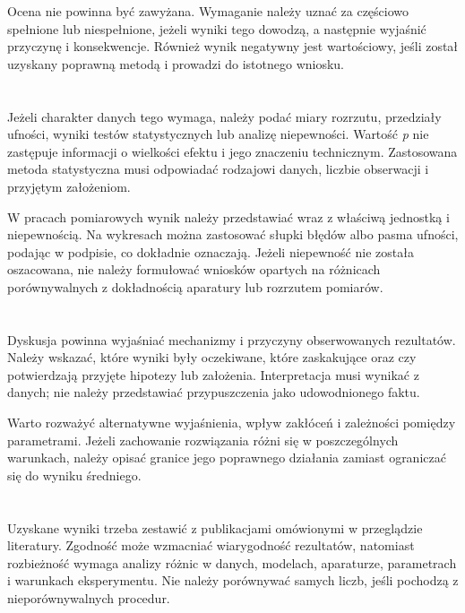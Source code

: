 Ocena nie powinna być zawyżana. Wymaganie należy uznać za częściowo spełnione lub niespełnione, jeżeli wyniki tego dowodzą, a następnie wyjaśnić przyczynę i konsekwencje. Również wynik negatywny jest wartościowy, jeśli został uzyskany poprawną metodą i prowadzi do istotnego wniosku.

\section{}

Jeżeli charakter danych tego wymaga, należy podać miary rozrzutu, przedziały ufności, wyniki testów statystycznych lub analizę niepewności. Wartość \emph{p} nie zastępuje informacji o wielkości efektu i jego znaczeniu technicznym. Zastosowana metoda statystyczna musi odpowiadać rodzajowi danych, liczbie obserwacji i przyjętym założeniom.

W pracach pomiarowych wynik należy przedstawiać wraz z właściwą jednostką i niepewnością. Na wykresach można zastosować słupki błędów albo pasma ufności, podając w podpisie, co dokładnie oznaczają. Jeżeli niepewność nie została oszacowana, nie należy formułować wniosków opartych na różnicach porównywalnych z dokładnością aparatury lub rozrzutem pomiarów.

\section{}

Dyskusja powinna wyjaśniać mechanizmy i przyczyny obserwowanych rezultatów. Należy wskazać, które wyniki były oczekiwane, które zaskakujące oraz czy potwierdzają przyjęte hipotezy lub założenia. Interpretacja musi wynikać z danych; nie należy przedstawiać przypuszczenia jako udowodnionego faktu.

Warto rozważyć alternatywne wyjaśnienia, wpływ zakłóceń i zależności pomiędzy parametrami. Jeżeli zachowanie rozwiązania różni się w poszczególnych warunkach, należy opisać granice jego poprawnego działania zamiast ograniczać się do wyniku średniego.

\section{}

Uzyskane wyniki trzeba zestawić z publikacjami omówionymi w przeglądzie literatury. Zgodność może wzmacniać wiarygodność rezultatów, natomiast rozbieżność wymaga analizy różnic w danych, modelach, aparaturze, parametrach i warunkach eksperymentu. Nie należy porównywać samych liczb, jeśli pochodzą z nieporównywalnych procedur.

